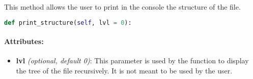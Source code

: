 This method allows the user to print in the console the structure of the file.

\begin{lstlisting}[language=Python]
def print_structure(self, lvl = 0):
\end{lstlisting}

\paragraph{Attributes:}
\begin{itemize}
    \item \textbf{lvl} \textit{(optional, default 0)}: This parameter is used by the function to display the tree of the file recursively. It is not meant to be used by the user.
\end{itemize}
